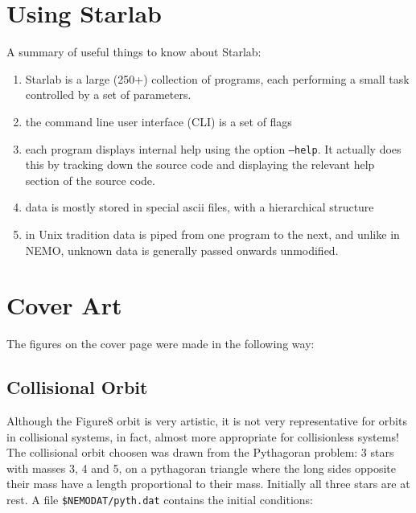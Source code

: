 \chapter                {Using Starlab}

A summary of useful things to know about Starlab:


\begin{enumerate}

\item
Starlab is a large (250+) collection of programs, each performing a small task
controlled by a set of parameters.

\item
the command line user interface (CLI) is a set of flags

\item
each program displays internal help using the option {\tt --help}.
It actually does this by tracking down the source code
and displaying the relevant help section of the source code.

\item
data is mostly stored in special ascii files, with a hierarchical structure

\item
in Unix tradition data is piped from one program to the next, and unlike
in NEMO, unknown data is generally passed onwards unmodified.

\end{enumerate}

\chapter                {Cover Art}

The figures on the cover page were made in the following way:

\section{Collisional Orbit}
\label{s:pyth} 

Although the Figure8 orbit is very artistic, it is not very representative
for orbits in collisional systems, in fact, almost more appropriate
for collisionless systems!
The collisional orbit choosen was drawn from the Pythagoran problem:
3 stars with masses 3, 4 and 5, on a pythagoran triangle where the
long sides opposite their mass have a length proportional to 
their mass. Initially
all three stars are at rest. A file {\tt \$NEMODAT/pyth.dat} contains
the initial conditions:


